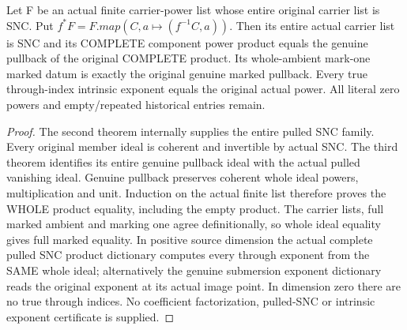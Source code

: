 \begin{theorem}
\label{hir:submersion-nc-whole-indexed-product}
\leanok
Let F be an actual finite carrier-power list whose entire original carrier
list is SNC. Put $f^*F=F.map(C,a\mapsto(f^{-1}C,a))$. Then its entire actual
carrier list is SNC and its COMPLETE component power product equals the
genuine pullback of the original COMPLETE product. Its whole-ambient
mark-one marked datum is exactly the original genuine marked pullback.
Every true through-index intrinsic exponent equals the original actual
power. All literal zero powers and empty/repeated historical entries remain.
\end{theorem}
\begin{proof}
The second theorem internally supplies the entire pulled SNC family.
Every original member ideal is coherent and invertible by actual SNC.
The third theorem identifies its entire genuine pullback ideal with the
actual pulled vanishing ideal. Genuine pullback preserves coherent whole
ideal powers, multiplication and unit. Induction on the actual finite list
therefore proves the WHOLE product equality, including the empty product.
The carrier lists, full marked ambient and marking one agree definitionally,
so whole ideal equality gives full marked equality. In positive source
dimension the actual complete pulled SNC product dictionary computes every
through exponent from the SAME whole ideal; alternatively the genuine
submersion exponent dictionary reads the original exponent at its actual
image point. In dimension zero there are no true through indices. No
coefficient factorization, pulled-SNC or intrinsic exponent certificate is
supplied.
\end{proof}

